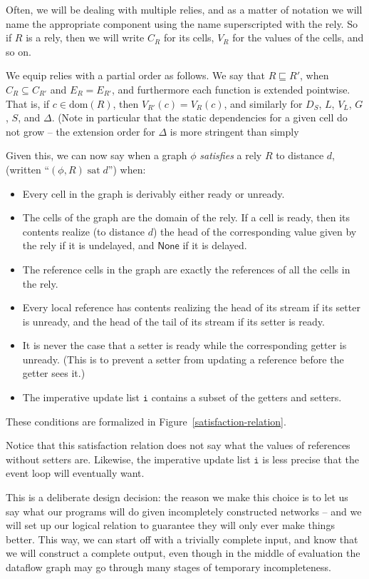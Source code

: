 \documentclass[preprint]{sigplanconf}
\newcommand{\dom}[1]{\mathrm{dom}({#1})}
\newcommand{\term}[1]{\ensuremath{\mathtt{{#1}}}}
\newcommand{\None}{\mathsf{None}}
\newcommand{\satisfy}[2]{{#1}\;\mathrm{sat}\;{#2}}
\begin{document}
Often, we will be dealing with multiple relies, and as a matter of
notation we will name the appropriate component using the name
superscripted with the rely. So if $R$ is a rely, then we will write
$C_R$ for its cells, $V_R$ for the values of the cells, and so on.

We equip relies with a partial order as follows. We say that $R
\sqsubseteq R'$, when $C_R \subseteq C_{R'}$ and $E_R = E_{R'}$, and
furthermore each function is extended pointwise. That is, if $c \in
\dom{R}$, then $V_{R'}(c) = V_{R}(c)$, and similarly for $D_S$, $L$,
$V_L$, $G$, $S$, and $\Delta$. (Note in particular that the static
dependencies for a given cell do not grow -- the extension order for
$\Delta$ is more stringent than simply

Given this, we can now say when a graph $\phi$ \emph{satisfies} a rely $R$ to
distance $d$, (written ``$\satisfy{(\phi, R)}{d}$'') when:
\begin{itemize}
  \item Every cell in the graph is derivably either ready or unready. 
  \item The cells of the graph are the domain of the rely. If a cell
    is ready, then its contents realize (to distance $d$) the head of
    the corresponding value given by the rely if it is undelayed, and
    $\None$ if it is delayed.
  \item The reference cells in the graph are exactly the references
    of all the cells in the rely.
  \item Every local reference has contents realizing the head of its
    stream if its setter is unready, and the head of the tail of its
    stream if its setter is ready. 
  \item It is never the case that a setter is ready while the
    corresponding getter is unready. (This is to prevent a setter
    from updating a reference before the getter sees it.)
  \item The imperative update list \term{i} contains a subset of 
    the getters and setters. 
\end{itemize}

These conditions are formalized in Figure~\ref{satisfaction-relation}. 

Notice that this satisfaction relation does not say what the values of
references without setters are. Likewise, the imperative update list
\term{i} is less precise that the event loop will eventually want.

This is a deliberate design decision: the reason we make this choice
is to let us say what our programs will do given incompletely
constructed networks -- and we will set up our logical relation to
guarantee they will only ever make things better. This way, we can
start off with a trivially complete input, and know that we will
construct a complete output, even though in the middle of evaluation
the dataflow graph may go through many stages of temporary
incompleteness.
\end{document}

